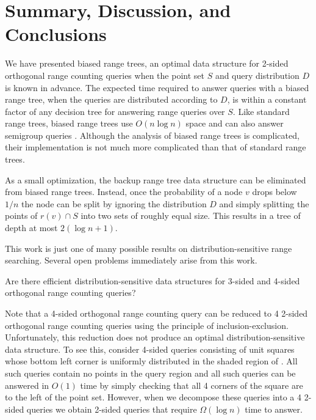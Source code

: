 \documentclass[lotsofwhite,charterfonts]{patmorin}
\begin{document}
\section{Summary, Discussion, and Conclusions}

We have presented biased range trees, an optimal data structure for
2-sided orthogonal range counting queries when the point set $S$ and
query distribution $D$ is known in advance. The expected time required
to answer queries with a biased range tree, when the queries are
distributed according to $D$, is within a constant factor of any
decision tree for answering range queries over $S$.  Like standard
range trees, biased range trees use $O(n\log n)$ space and can also
answer semigroup queries \cite{ae133,ae292}.  Although the analysis of
biased range trees is complicated, their implementation is not much
more complicated than that of standard range trees.

As a small optimization, the backup range tree data structure can be
eliminated from biased range trees.  Instead, once the probability of
a node $v$ drops below $1/n$ the node can be split by ignoring the
distribution $D$ and simply splitting the points of $r(v)\cap S$ into
two sets of roughly equal size.  This results in a tree of depth at
most $2(\log n+1)$.

This work is just one of many possible results on
distribution-sensitive range searching.  Several open problems
immediately arise from this work.

\begin{op}
Are there efficient distribution-sensitive data structures for 3-sided
and 4-sided orthogonal range counting queries?
\end{op}

Note that a 4-sided orthogonal range counting query can be reduced to
4 2-sided orthogonal range counting queries using the principle of
inclusion-exclusion.  Unfortunately, this reduction does not produce
an optimal distribution-sensitive data structure.  To see this,
consider 4-sided queries consisting of unit squares whose bottom left
corner is uniformly distributed in the shaded region of
.  All such queries contain no points in the query
region and all such queries can be answered in $O(1)$ time by simply
checking that all 4 corners of the square are to the left of the point
set.  However, when we decompose these queries into a 4 2-sided
queries we obtain 2-sided queries that require $\Omega(\log n)$ time
to answer.
\end{document}
